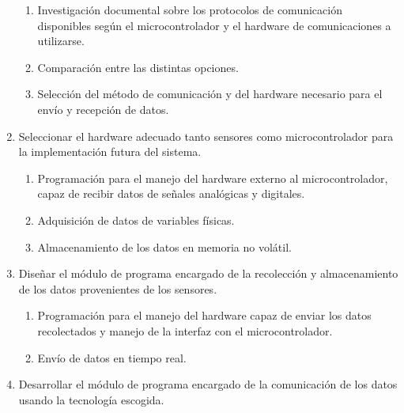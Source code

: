 \documentclass[12pt,letterpaper]{article}
\begin{document}
\begin{enumerate}[1.]
	      \begin{enumerate}

		      \item Investigación documental sobre los protocolos de comunicación disponibles según el microcontrolador y el hardware de comunicaciones a utilizarse.

		      \item Comparación entre las distintas opciones.

		      \item Selección del método de comunicación y del hardware necesario para el envío y recepción de datos.

	      \end{enumerate}


	\item Seleccionar el hardware adecuado tanto sensores como microcontrolador para la implementación futura del sistema.


	      \begin{enumerate}

		      \item Programación para el manejo del hardware externo al microcontrolador, capaz de recibir datos de señales analógicas y digitales.
		      \item Adquisición de datos de variables físicas.
		      \item Almacenamiento de los datos en memoria no volátil.

	      \end{enumerate}

	\item Diseñar el módulo de programa encargado de la recolección y almacenamiento de los datos provenientes de los sensores.


	      \begin{enumerate}

		      \item Programación para el manejo del hardware capaz de enviar los datos recolectados y manejo de la interfaz con el microcontrolador.
		      \item Envío de datos en tiempo real.

	      \end{enumerate}



	\item Desarrollar el módulo de programa encargado de la comunicación de los datos usando la tecnología escogida.


	      \begin{enumerate}


\end{enumerate}
\end{enumerate}
\end{document}
